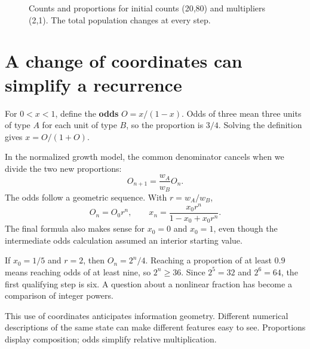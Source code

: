 \documentclass[11pt,oneside,openany]{book}
\theoremstyle{definition}
\theoremstyle{remark}
\numberwithin{equation}{chapter}
\begin{document}
\begin{figure}[htbp]\centering
{}
\caption{Counts and proportions for initial counts (20,80) and multipliers (2,1). The total population changes at every step.}\end{figure}

\section{A change of coordinates can simplify a recurrence}\label{ch01-a-change-of-coordinates-can-simplify-a-recurrence}

For \(0<x<1\), define the \textbf{odds} \(O=x/(1-x)\). Odds of three mean three units of type \(A\) for each unit of type \(B\), so the proportion is \(3/4\). Solving the definition gives \(x=O/(1+O)\).

In the normalized growth model, the common denominator cancels when we divide the two new proportions: \[O_{n+1}=\frac{w_A}{w_B}O_n.\] The odds follow a geometric sequence. With \(r=w_A/w_B\), \[O_n=O_0r^n,\qquad
x_n=\frac{x_0r^n}{1-x_0+x_0r^n}.\] The final formula also makes sense for \(x_0=0\) and \(x_0=1\), even though the intermediate odds calculation assumed an interior starting value.

If \(x_0=1/5\) and \(r=2\), then \(O_n=2^n/4\). Reaching a proportion of at least \(0.9\) means reaching odds of at least nine, so \(2^n\geq36\). Since \(2^5=32\) and \(2^6=64\), the first qualifying step is six. A question about a nonlinear fraction has become a comparison of integer powers.

This use of coordinates anticipates information geometry. Different numerical descriptions of the same state can make different features easy to see. Proportions display composition; odds simplify relative multiplication.
\end{document}
